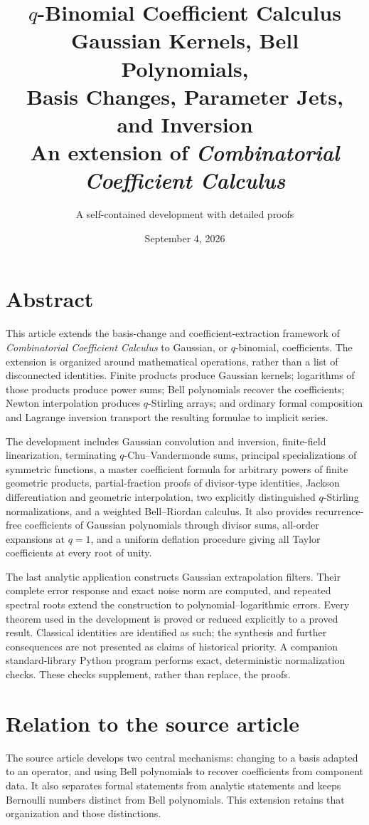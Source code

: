 \documentclass[11pt,a4paper,oneside,openany]{book}
\title{\Huge\bfseries \(q\)-Binomial Coefficient Calculus\\[4mm]
 \Large Gaussian Kernels, Bell Polynomials,\\
 Basis Changes, Parameter Jets, and Inversion\\[7mm]
 \large An extension of \emph{Combinatorial Coefficient Calculus}}
\author{A self-contained development with detailed proofs}
\date{September 4, 2026}
\theoremstyle{definition}
\theoremstyle{remark}
\begin{document}
\frontmatter
\hypersetup{pageanchor=false}
\maketitle
\hypersetup{pageanchor=true}
\chapter*{Abstract}
This article extends the basis-change and coefficient-extraction framework of
\emph{Combinatorial Coefficient Calculus} to Gaussian, or \(q\)-binomial,
coefficients. The extension is organized around mathematical operations, rather
than a list of disconnected identities. Finite products produce Gaussian kernels;
logarithms of those products produce power sums; Bell polynomials recover the
coefficients; Newton interpolation produces \(q\)-Stirling arrays; and ordinary
formal composition and Lagrange inversion transport the resulting formulae to
implicit series.

The development includes Gaussian convolution and inversion, finite-field
linearization, terminating \(q\)-Chu--Vandermonde sums, principal specializations
of symmetric functions, a master coefficient formula for arbitrary powers of
finite geometric products, partial-fraction proofs of divisor-type identities,
Jackson differentiation and geometric interpolation, two explicitly distinguished
\(q\)-Stirling normalizations, and a weighted Bell--Riordan calculus. It also
provides recurrence-free coefficients of Gaussian polynomials through divisor
sums, all-order expansions at \(q=1\), and a uniform deflation procedure giving
all Taylor coefficients at every root of unity.

The last analytic application constructs Gaussian extrapolation filters. Their
complete error response and exact noise norm are computed, and repeated spectral
roots extend the construction to polynomial--logarithmic errors. Every theorem
used in the development is proved or reduced explicitly to a proved result.
Classical identities are identified as such; the synthesis and further
consequences are not presented as claims of historical priority. A companion
standard-library Python program performs exact, deterministic normalization
checks. These checks supplement, rather than replace, the proofs.

\chapter*{Relation to the source article}
The source article \cite{source} develops two central mechanisms: changing to a
basis adapted to an operator, and using Bell polynomials to recover coefficients
from component data. It also separates formal statements from analytic statements
and keeps Bernoulli numbers distinct from Bell polynomials. This extension retains
that organization and those distinctions.
\end{document}

